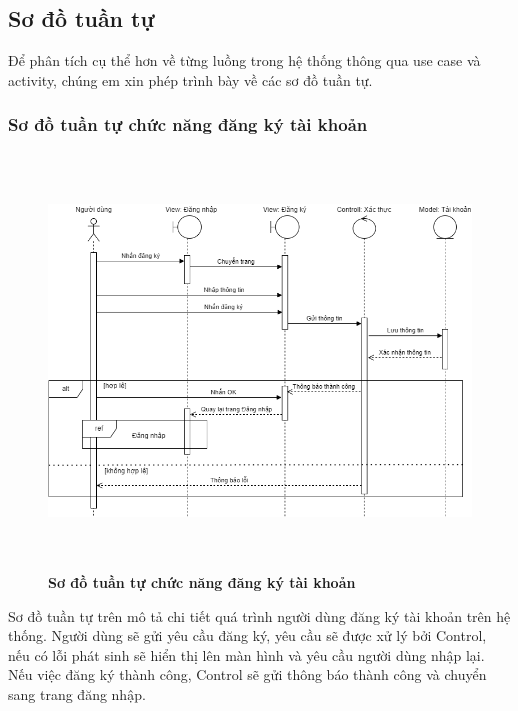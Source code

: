 \subsection{Sơ đồ tuần tự}
Để phân tích cụ thể hơn về từng luồng trong hệ thống thông qua use case và activity, chúng em xin phép
trình bày về các sơ đồ tuần tự.

\subsubsection{Sơ đồ tuần tự chức năng đăng ký tài khoản}
\begin{figure}[H]
  \centering
  \includegraphics[width=14.5cm,height=11cm]{Images/sequence/sequence_register.png}
  \caption[Sơ đồ tuần tự chức năng đăng ký tài khoản]{\bfseries \fontsize{12pt}{0pt}
  \selectfont Sơ đồ tuần tự chức năng đăng ký tài khoản}
  \label{sequence_register} %
\end{figure}
Sơ đồ tuần tự trên mô tả chi tiết quá trình người dùng đăng ký tài khoản trên hệ thống. Người dùng sẽ gửi yêu cầu đăng ký, yêu cầu sẽ được xử lý
bởi Control, nếu có lỗi phát sinh sẽ hiển thị lên màn hình và yêu cầu người dùng nhập lại. Nếu việc đăng ký thành công, Control sẽ gửi thông báo 
thành công và chuyển sang trang đăng nhập.  


